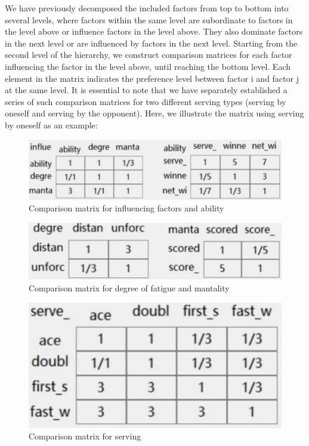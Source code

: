 \documentclass[12pt, a4paper, oneside]{article}
\theoremstyle{break}
\begin{document}
We have previously decomposed the included factors from top to bottom into several levels, where factors within the same level are subordinate to factors in the level above or influence factors in the level above. They also dominate factors in the next level or are influenced by factors in the next level. Starting from the second level of the hierarchy, we construct comparison matrices for each factor influencing the factor in the level above, until reaching the bottom level. Each element in the matrix indicates the preference level between factor i and factor j at the same level. It is essential to note that we have separately established a series of such comparison matrices for two different serving types (serving by oneself and serving by the opponent). Here, we illustrate the matrix using serving by oneself as an example:



\begin{figure}[H]
    \centering
    \includegraphics[scale=0.06]{imgs/2.jpg}
    \caption{Comparison matrix for influencing factors and ability}
\end{figure}
\begin{figure}[H]
    \centering
    \includegraphics[scale=0.06]{imgs/3.jpg}
    \caption{Comparison matrix for degree of fatigue and mantality}
\end{figure}
\begin{figure}[H]
    \centering
    \includegraphics[scale=0.06]{imgs/4.jpg}
    \caption{Comparison matrix for serving}
\end{figure}
\end{document}
